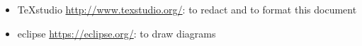\begin{itemize}
	\item TeXstudio \url{http://www.texstudio.org/}: to redact and to format this document	
	\item eclipse \url{https://eclipse.org/}: to draw diagrams
\end{itemize}